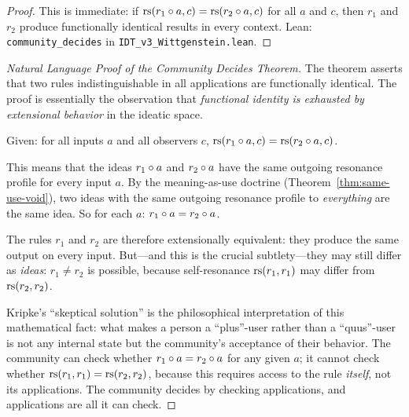 \begin{proof}
This is immediate: if $\mathrm{rs}(r_1 \circ a, c) = \mathrm{rs}(r_2 \circ a, c)$ for
all $a$ and $c$, then $r_1$ and $r_2$ produce functionally identical results in
every context.
Lean: \texttt{community\_decides} in \texttt{IDT\_v3\_Wittgenstein.lean}.
\end{proof}

\begin{proof}[Natural Language Proof of the Community Decides Theorem]
The theorem asserts that two rules indistinguishable in all applications are
functionally identical. The proof is essentially the observation that
\emph{functional identity is exhausted by extensional behavior} in the ideatic
space.

Given: for all inputs $a$ and all observers $c$,
$\mathrm{rs}(r_1 \circ a, c) = \mathrm{rs}(r_2 \circ a, c)$.

This means that the ideas $r_1 \circ a$ and $r_2 \circ a$ have the same
outgoing resonance profile for every input $a$. By the meaning-as-use doctrine
(Theorem~\ref{thm:same-use-void}), two ideas with the same outgoing resonance
profile to \emph{everything} are the same idea. So for each $a$:
$r_1 \circ a = r_2 \circ a$.

The rules $r_1$ and $r_2$ are therefore extensionally equivalent: they produce
the same output on every input. But---and this is the crucial subtlety---they
may still differ as \emph{ideas}: $r_1 \neq r_2$ is possible, because
self-resonance $\mathrm{rs}(r_1, r_1)$ may differ from $\mathrm{rs}(r_2, r_2)$.

Kripke's ``skeptical solution'' is the philosophical interpretation of this
mathematical fact: what makes a person a ``plus''-user rather than a ``quus''-user
is not any internal state but the community's acceptance of their behavior.
The community can check whether $r_1 \circ a = r_2 \circ a$ for any
given $a$; it cannot check whether $\mathrm{rs}(r_1, r_1) = \mathrm{rs}(r_2, r_2)$, because
this requires access to the rule \emph{itself}, not its applications. The
community decides by checking applications, and applications are all it can
check.
\end{proof}

